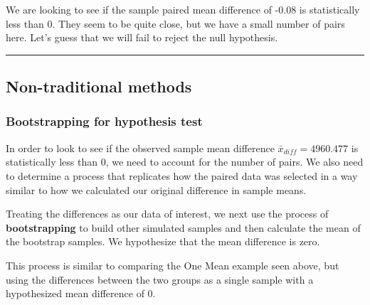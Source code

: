 \documentclass[12pt,]{krantz}
\makeatletter
\newenvironment{Shaded}{\begin{snugshade}}{\end{snugshade}}
\newcommand{\KeywordTok}[1]{\textcolor[rgb]{0.27,0.27,0.27}{\textbf{#1}}}
\newcommand{\DataTypeTok}[1]{\textcolor[rgb]{0.27,0.27,0.27}{#1}}
\newcommand{\DecValTok}[1]{\textcolor[rgb]{0.06,0.06,0.06}{#1}}
\newcommand{\StringTok}[1]{\textcolor[rgb]{0.5,0.5,0.5}{#1}}
\newcommand{\OperatorTok}[1]{\textcolor[rgb]{0.43,0.43,0.43}{\textbf{#1}}}
\newcommand{\NormalTok}[1]{#1}
\newenvironment{kframe}{%
\medskip{}
\setlength{\fboxsep}{.8em}
 \def\at@end@of@kframe{}%
 \ifinner\ifhmode%
  \def\at@end@of@kframe{\end{minipage}}%
  \begin{minipage}{\columnwidth}%
 \fi\fi%
 \def\FrameCommand##1{\hskip\@totalleftmargin \hskip-\fboxsep
 \colorbox{shadecolor}{##1}\hskip-\fboxsep
     \hskip-\linewidth \hskip-\@totalleftmargin \hskip\columnwidth}%
 \MakeFramed {\advance\hsize-\width
   \@totalleftmargin\z@ \linewidth\hsize
   \@setminipage}}%
 {\par\unskip\endMakeFramed%
 \at@end@of@kframe}
\renewenvironment{Shaded}{\begin{kframe}}{\end{kframe}}
\theoremstyle{definition}
\theoremstyle{definition}
\theoremstyle{definition}
\theoremstyle{remark}
\makeatother
\begin{document}
We are looking to see if the sample paired mean difference of -0.08 is
statistically less than 0. They seem to be quite close, but we have a
small number of pairs here. Let's guess that we will fail to reject the
null hypothesis.

\begin{center}\rule{0.5\linewidth}{\linethickness}\end{center}

\subsection{Non-traditional methods}\label{non-traditional-methods-4}

\subsubsection*{Bootstrapping for hypothesis
test}\label{bootstrapping-for-hypothesis-test-1}


In order to look to see if the observed sample mean difference
\(\bar{x}_{diff} = 4960.477\) is statistically less than 0, we need to
account for the number of pairs. We also need to determine a process
that replicates how the paired data was selected in a way similar to how
we calculated our original difference in sample means.

Treating the differences as our data of interest, we next use the
process of \textbf{bootstrapping} to build other simulated samples and
then calculate the mean of the bootstrap samples. We hypothesize that
the mean difference is zero.

This process is similar to comparing the One Mean example seen above,
but using the differences between the two groups as a single sample with
a hypothesized mean difference of 0.

\begin{Shaded}
\end{Shaded}
\end{document}
